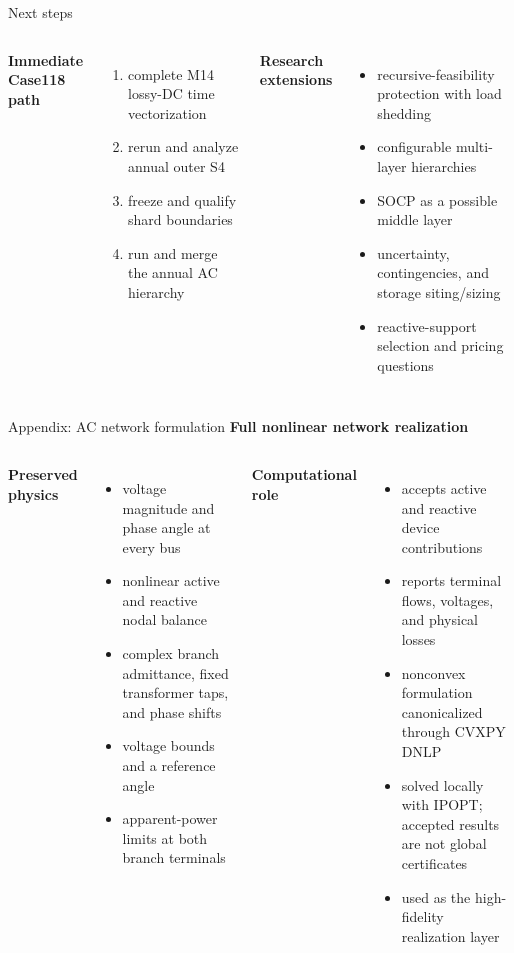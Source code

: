 \documentclass[aspectratio=169,11pt]{beamer}
\newcommand{\tightitems}{\setlength{\itemsep}{0.42em}}
\begin{document}
\begin{frame}{Next steps}
  \begin{columns}[T,onlytextwidth]
    \textbf{Immediate Case118 path}
      \begin{enumerate}\tightitems
        \item complete M14 lossy-DC time vectorization
        \item rerun and analyze annual outer S4
        \item freeze and qualify shard boundaries
        \item run and merge the annual AC hierarchy
      \end{enumerate}
    \textbf{Research extensions}
      \begin{itemize}\tightitems
        \item recursive-feasibility protection with load shedding
        \item configurable multi-layer hierarchies
        \item SOCP as a possible middle layer
        \item uncertainty, contingencies, and storage siting/sizing
        \item reactive-support selection and pricing questions
      \end{itemize}
  \end{columns}
\end{frame}

\appendix

\begin{frame}{Appendix: AC network formulation}
  \textbf{Full nonlinear network realization}
  \begin{columns}[T,onlytextwidth]
    \textbf{Preserved physics}
    \begin{itemize}\small\tightitems
      \item voltage magnitude and phase angle at every bus
      \item nonlinear active and reactive nodal balance
      \item complex branch admittance, fixed transformer taps, and phase shifts
      \item voltage bounds and a reference angle
      \item apparent-power limits at both branch terminals
    \end{itemize}
    \textbf{Computational role}
    \begin{itemize}\small\tightitems
      \item accepts active and reactive device contributions
      \item reports terminal flows, voltages, and physical losses
      \item nonconvex formulation canonicalized through CVXPY DNLP
      \item solved locally with IPOPT; accepted results are not global certificates
      \item used as the high-fidelity realization layer
    \end{itemize}
  \end{columns}
\end{frame}
\end{document}
